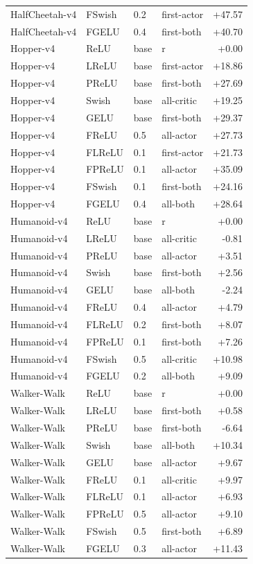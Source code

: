 {\begin{longtable}{llllr}
HalfCheetah-v4 & FSwish & 0.2 & first-actor & +47.57 \\
HalfCheetah-v4 & FGELU & 0.4 & first-both & +40.70 \\
Hopper-v4 & ReLU & base & r & +0.00 \\
Hopper-v4 & LReLU & base & first-actor & +18.86 \\
Hopper-v4 & PReLU & base & first-both & +27.69 \\
Hopper-v4 & Swish & base & all-critic & +19.25 \\
Hopper-v4 & GELU & base & first-both & +29.37 \\
Hopper-v4 & FReLU & 0.5 & all-actor & +27.73 \\
Hopper-v4 & FLReLU & 0.1 & first-actor & +21.73 \\
Hopper-v4 & FPReLU & 0.1 & all-actor & +35.09 \\
Hopper-v4 & FSwish & 0.1 & first-both & +24.16 \\
Hopper-v4 & FGELU & 0.4 & all-both & +28.64 \\
Humanoid-v4 & ReLU & base & r & +0.00 \\
Humanoid-v4 & LReLU & base & all-critic & -0.81 \\
Humanoid-v4 & PReLU & base & all-actor & +3.51 \\
Humanoid-v4 & Swish & base & first-both & +2.56 \\
Humanoid-v4 & GELU & base & all-both & -2.24 \\
Humanoid-v4 & FReLU & 0.4 & all-actor & +4.79 \\
Humanoid-v4 & FLReLU & 0.2 & first-both & +8.07 \\
Humanoid-v4 & FPReLU & 0.1 & first-both & +7.26 \\
Humanoid-v4 & FSwish & 0.5 & all-critic & +10.98 \\
Humanoid-v4 & FGELU & 0.2 & all-both & +9.09 \\
Walker-Walk & ReLU & base & r & +0.00 \\
Walker-Walk & LReLU & base & first-both & +0.58 \\
Walker-Walk & PReLU & base & first-both & -6.64 \\
Walker-Walk & Swish & base & all-both & +10.34 \\
Walker-Walk & GELU & base & all-actor & +9.67 \\
Walker-Walk & FReLU & 0.1 & all-critic & +9.97 \\
Walker-Walk & FLReLU & 0.1 & all-actor & +6.93 \\
Walker-Walk & FPReLU & 0.5 & all-actor & +9.10 \\
Walker-Walk & FSwish & 0.5 & first-both & +6.89 \\
Walker-Walk & FGELU & 0.3 & all-actor & +11.43 \\
\end{longtable}
}
